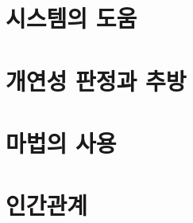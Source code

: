 \documentclass{report}
\begin{document}
	\section{시스템의 도움}
		
	
	\section{개연성 판정과 추방}
		
	
	\section{마법의 사용}
		
	
	\section{인간관계}
		
	
\end{document}
